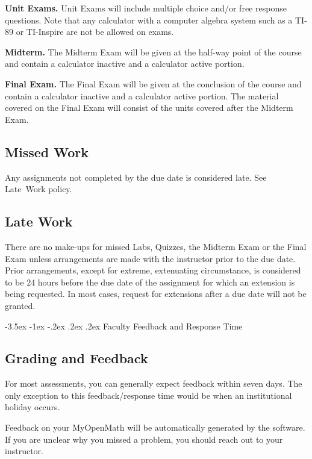\documentclass[11pt]{article}
\makeatletter
\renewcommand\section{\@startsection{section}{1}{0pt}%
  {-3.5ex \@plus -1ex \@minus -.2ex}%
  {.2ex \@plus.2ex}%
  {\normalfont\Large\bfseries}} %
\makeatother
\begin{document}
\textbf{Unit Exams.} Unit Exams will include multiple choice and/or free response questions. Note that any calculator with a computer algebra system such as a TI-89 or TI-Inspire are not be allowed on exams.

\textbf{Midterm.} The Midterm Exam will be given at the half-way point of the course and contain a calculator inactive and a calculator active portion.

\textbf{Final Exam.} The Final Exam will be given at the conclusion of the course and contain a calculator inactive and a calculator active portion. The material covered on the Final Exam will consist of the units covered after the Midterm Exam.

\subsection{Missed Work}

Any assignments not completed by the due date is considered late. See Late~Work policy.

\subsection{Late Work}\label{late-work}

There are no make-ups for missed Labs, Quizzes, the Midterm Exam or the Final Exam unless arrangements are made with the instructor prior to the due date. Prior arrangements, except for extreme, extenuating circumstance, is considered to be 24 hours before the due date of the assignment for which an extension is being requested. In most cases, request for extensions after a due date will not be granted.

\section{Faculty Feedback and Response Time}

\subsection{Grading and Feedback}

For most assessments, you can generally expect feedback within seven days. The only exception to this feedback/response time would be when an institutional holiday occurs.

Feedback on your MyOpenMath will be automatically generated by the software. If you are unclear why you missed a problem, you should reach out to your instructor.
\end{document}
